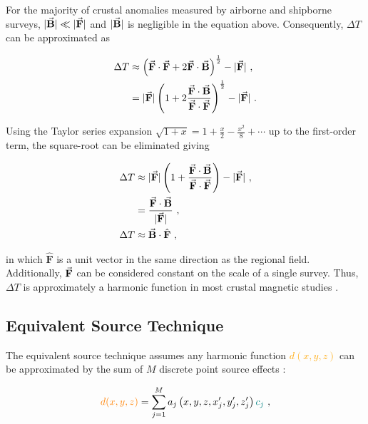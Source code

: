 \noindent
For the majority of crustal anomalies measured by airborne and shipborne surveys, $\vert \vec{\mathbf{B}} \vert \ll \vert \vec{\mathbf{F}} \vert$ and $\vert \vec{\mathbf{B}} \vert$ is negligible in the equation above. Consequently, $\Delta T$ can be approximated as \citep{Blakley1995}

\begin{align}
    \Delta T &\approx \left(\vec{\mathbf{F}} \cdot \vec{\mathbf{F}} + 2\vec{\mathbf{F}} \cdot \vec{\mathbf{B}}\right)^{\frac{1}{2}} - \vert \vec{\mathbf{F}} \vert \ ,
    \\
    &= \vert \vec{\mathbf{F}} \vert \left(1 + 2\dfrac{\vec{\mathbf{F}} \cdot \vec{\mathbf{B}}}{\vec{\mathbf{F}} \cdot \vec{\mathbf{F}}}\right)^{\frac{1}{2}} - \vert \vec{\mathbf{F}} \vert \ .
    \label{eq:}
\end{align}

\noindent
Using the Taylor series expansion $\sqrt{1 + x} = 1 + \frac{x}{2} - \frac{x^2}{8} + \cdots$ up to the first-order term, the square-root can be eliminated giving

\begin{align}
    \Delta T & \approx \vert \vec{\mathbf{F}} \vert \left(1 + \dfrac{\vec{\mathbf{F}} \cdot \vec{\mathbf{B}}}{\vec{\mathbf{F}} \cdot \vec{\mathbf{F}}}\right) - \vert \vec{\mathbf{F}} \vert \ ,
    \\
    &=
    \dfrac{\vec{\mathbf{F}} \cdot \vec{\mathbf{B}}}{\vert \vec{\mathbf{F}} \vert} \ ,
    \\
\label{eq:tfa_dot_product}
    \Delta T & \approx \vec{\mathbf{B}} \cdot \hat{\mathbf{F}}
    \ ,
\end{align}

\noindent
in which $\hat{\mathbf{F}}$ is a unit vector in the same direction as the regional field. Additionally, $\vec{\mathbf{F}}$ can be considered constant on the scale of a single survey. Thus, $\Delta T$ is approximately a harmonic function in most crustal magnetic studies \citep{Blakley1995,OliveiraJr2015}.


\subsection{Equivalent Source Technique}

The equivalent source technique assumes any harmonic function \textcolor{orange}{$d(x, y, z)$} can be approximated by the sum of $M$ discrete point source effects \citep{Dampney1969, Cordell1992}:

\begin{equation}
\label{eq:eqs_technique}
\textcolor{orange}{d (x, y, z)} = \sum_{j=1}^{M} a_j\left(x, y, z, x'_j, y'_j , z'_j\right) \textcolor{teal}{c_j}
\ ,
\end{equation}

